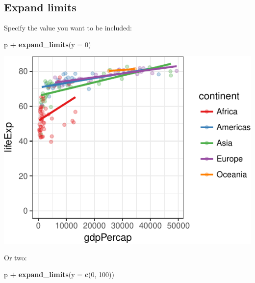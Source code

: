 \documentclass[12pt,]{krantz}
\makeatletter
\newenvironment{Shaded}{\begin{snugshade}}{\end{snugshade}}
\newcommand{\DataTypeTok}[1]{\textcolor[rgb]{0.13,0.29,0.53}{#1}}
\newcommand{\DecValTok}[1]{\textcolor[rgb]{0.00,0.00,0.81}{#1}}
\newcommand{\KeywordTok}[1]{\textcolor[rgb]{0.13,0.29,0.53}{\textbf{#1}}}
\newcommand{\NormalTok}[1]{#1}
\newcommand{\OperatorTok}[1]{\textcolor[rgb]{0.81,0.36,0.00}{\textbf{#1}}}
\newcommand{\StringTok}[1]{\textcolor[rgb]{0.31,0.60,0.02}{#1}}
\newenvironment{kframe}{%
\medskip{}
\setlength{\fboxsep}{.8em}
 \def\at@end@of@kframe{}%
 \ifinner\ifhmode%
  \def\at@end@of@kframe{\end{minipage}}%
  \begin{minipage}{\columnwidth}%
 \fi\fi%
 \def\FrameCommand##1{\hskip\@totalleftmargin \hskip-\fboxsep
 \colorbox{shadecolor}{##1}\hskip-\fboxsep
     \hskip-\linewidth \hskip-\@totalleftmargin \hskip\columnwidth}%
 \MakeFramed {\advance\hsize-\width
   \@totalleftmargin\z@ \linewidth\hsize
   \@setminipage}}%
 {\par\unskip\endMakeFramed%
 \at@end@of@kframe}
\renewenvironment{Shaded}{\begin{kframe}}{\end{kframe}}
\theoremstyle{definition}
\theoremstyle{definition}
\theoremstyle{definition}
\theoremstyle{remark}
\makeatother
\begin{document}
\hypertarget{expand-limits}{%
\subsection{Expand limits}\label{expand-limits}}

Specify the value you want to be included:

\begin{Shaded}
\begin{Highlighting}[]
\NormalTok{p }\OperatorTok{+}
\StringTok{  }\KeywordTok{expand_limits}\NormalTok{(}\DataTypeTok{y =} \DecValTok{0}\NormalTok{)}
\end{Highlighting}
\end{Shaded}

\includegraphics{05_fine_tuning_plots_files/figure-latex/unnamed-chunk-3-1.pdf}

\newpage

Or two:

\begin{Shaded}
\begin{Highlighting}[]
\NormalTok{p }\OperatorTok{+}
\StringTok{  }\KeywordTok{expand_limits}\NormalTok{(}\DataTypeTok{y =} \KeywordTok{c}\NormalTok{(}\DecValTok{0}\NormalTok{, }\DecValTok{100}\NormalTok{))}
\end{Highlighting}
\end{Shaded}
\end{document}
